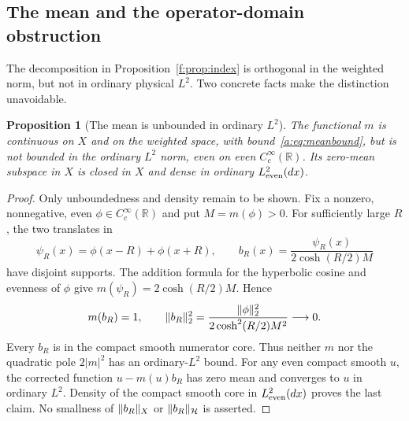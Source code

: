\documentclass[11pt,a4paper]{article}
\numberwithin{equation}{section}
\newtheorem{proposition}[theorem]{Proposition}
\theoremstyle{definition}\newtheorem{definition}[theorem]{Definition}
\theoremstyle{remark}\newtheorem{remark}[theorem]{Remark}
\newcommand{\R}{\mathbb R}\newcommand{\C}{\mathbb C}\newcommand{\N}{\mathbb N}
\newcommand{\Hh}{\mathcal H}\newcommand{\Hw}{\mathcal H}
\begin{document}
\subsection{The mean and the operator-domain obstruction}\label{f:sec:mean}

The decomposition in Proposition~\ref{f:prop:index} is orthogonal in the weighted norm, but not in ordinary physical $L^2$. Two concrete facts make the distinction unavoidable.

\begin{proposition}[The mean is unbounded in ordinary $L^2$]\label{f:prop:mean}
The functional $m$ is continuous on $X$ and on the weighted space, with bound~\eqref{a:eq:meanbound}, but is not bounded in the ordinary $L^2$ norm, even on even $C_c^\infty(\R)$. Its zero-mean subspace in $X$ is closed in $X$ and dense in ordinary $L^2_{\mathrm{even}}(dx)$.
\end{proposition}
\begin{proof}
Only unboundedness and density remain to be shown. Fix a nonzero, nonnegative, even $\phi\in C_c^\infty(\R)$ and put $M=m(\phi)>0$. For sufficiently large $R$, the two translates in
\[
 \psi_R(x)=\phi(x-R)+\phi(x+R),\qquad
 b_R(x)=\frac{\psi_R(x)}{2\cosh(R/2)M}
\]
have disjoint supports. The addition formula for the hyperbolic cosine and evenness of $\phi$ give $m(\psi_R)=2\cosh(R/2)M$. Hence
\begin{equation}\label{f:eq:unboundedmean}
 m(b_R)=1,\qquad
 \lVert b_R\rVert_2^2=\frac{\lVert\phi\rVert_2^2}{2\cosh^2(R/2)M^2}\longrightarrow0.
\end{equation}
Every $b_R$ is in the compact smooth numerator core. Thus neither $m$ nor the quadratic pole $2|m|^2$ has an ordinary-$L^2$ bound. For any even compact smooth $u$, the corrected function $u-m(u)b_R$ has zero mean and converges to $u$ in ordinary $L^2$. Density of the compact smooth core in $L^2_{\mathrm{even}}(dx)$ proves the last claim. No smallness of $\lVert b_R\rVert_X$ or $\norm{b_R}_{\Hh}$ is asserted.
\end{proof}
\end{document}
